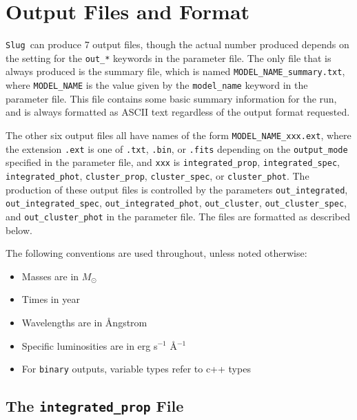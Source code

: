 \documentclass[12pt]{article}
\newcommand{\Slug}{\texttt{Slug}}
\begin{document}
\section{Output Files and Format}
\label{sec:output}

\Slug\ can produce 7 output files, though the actual number produced depends on the setting for the \verb=out_*= keywords in the parameter file. The only file that is always produced is the summary file, which is named \texttt{MODEL\_NAME\_summary.txt}, where \texttt{MODEL\_NAME} is the value given by the \verb=model_name= keyword in the parameter file. This file contains some basic summary information for the run, and is always formatted as ASCII text regardless of the output format requested.

The other six output files all have names of the form \texttt{MODEL\_NAME\_xxx.ext}, where the extension \texttt{.ext} is one of \texttt{.txt}, \texttt{.bin}, or \texttt{.fits} depending on the \verb=output_mode= specified in the parameter file, and \verb=xxx= is \texttt{integrated\_prop}, \texttt{integrated\_spec}, \texttt{integrated\_phot}, \texttt{cluster\_prop}, \texttt{cluster\_spec}, or \texttt{cluster\_phot}. The production of these output files is controlled by the parameters \verb=out_integrated=, \verb=out_integrated_spec=, \verb=out_integrated_phot=, \verb=out_cluster=, \verb=out_cluster_spec=, and \verb=out_cluster_phot= in the parameter file. The files are formatted as described below. 

The following conventions are used throughout, unless noted otherwise:
\begin{itemize}
\item Masses are in $M_\odot$
\item Times in year
\item Wavelengths are in {\AA}ngstrom
\item Specific luminosities are in erg s$^{-1}$ \AA$^{-1}$
\item For \verb=binary= outputs, variable types refer to c++ types
\end{itemize}

\subsection{The \texttt{integrated\_prop} File}
\end{document}
